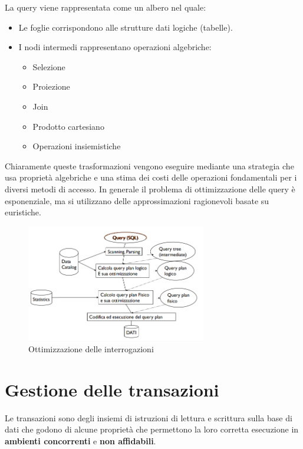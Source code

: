\begin{definizione}
      La query viene rappresentata come un albero nel quale:
      \begin{itemize}
            \item Le foglie corrispondono alle strutture dati logiche (tabelle).
            \item I nodi intermedi rappresentano operazioni algebriche:
                  \begin{itemize}
                        \item Selezione
                        \item Proiezione
                        \item Join
                        \item Prodotto cartesiano
                        \item Operazioni insiemistiche
                  \end{itemize}
      \end{itemize}
\end{definizione}
Chiaramente queste trasformazioni vengono eseguire mediante una strategia che
usa proprietà algebriche e una stima dei costi delle operazioni fondamentali per
i diversi metodi di accesso. In generale il problema di ottimizzazione delle
query è esponenziale, ma si utilizzano delle approssimazioni ragionevoli basate
su euristiche.
\begin{figure}[!ht]
      \centering
      \includegraphics[width=0.7\textwidth]{./img/DBMS/Ottimizzazione_query.png}
      \caption{Ottimizzazione delle interrogazioni}
      \label{fig:Query_Optimization}
\end{figure}
\section{Gestione delle transazioni}
Le transazioni sono degli insiemi di istruzioni di lettura e scrittura sulla base
di dati che godono di alcune proprietà che permettono la loro corretta esecuzione
in \textbf{ambienti concorrenti} e \textbf{non affidabili}.

